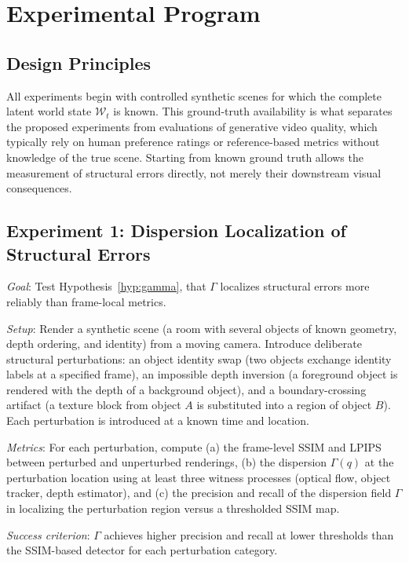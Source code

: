 \documentclass[11pt,a4paper]{article}
\theoremstyle{plain}
\theoremstyle{definition}
\theoremstyle{remark}
\begin{document}
\section{Experimental Program}
\label{sec:experiments}

\subsection{Design Principles}

All experiments begin with controlled synthetic scenes for which the complete latent world state $\mathcal{W}_t$ is known. This ground-truth availability is what separates the proposed experiments from evaluations of generative video quality, which typically rely on human preference ratings or reference-based metrics without knowledge of the true scene. Starting from known ground truth allows the measurement of structural errors directly, not merely their downstream visual consequences.

\subsection{Experiment 1: Dispersion Localization of Structural Errors}

\textit{Goal}: Test Hypothesis~\ref{hyp:gamma}, that $\Gamma$ localizes structural errors more reliably than frame-local metrics.

\textit{Setup}: Render a synthetic scene (a room with several objects of known geometry, depth ordering, and identity) from a moving camera. Introduce deliberate structural perturbations: an object identity swap (two objects exchange identity labels at a specified frame), an impossible depth inversion (a foreground object is rendered with the depth of a background object), and a boundary-crossing artifact (a texture block from object $A$ is substituted into a region of object $B$). Each perturbation is introduced at a known time and location.

\textit{Metrics}: For each perturbation, compute (a) the frame-level SSIM and LPIPS between perturbed and unperturbed renderings, (b) the dispersion $\Gamma(q)$ at the perturbation location using at least three witness processes (optical flow, object tracker, depth estimator), and (c) the precision and recall of the dispersion field $\Gamma$ in localizing the perturbation region versus a thresholded SSIM map.

\textit{Success criterion}: $\Gamma$ achieves higher precision and recall at lower thresholds than the SSIM-based detector for each perturbation category.
\end{document}
